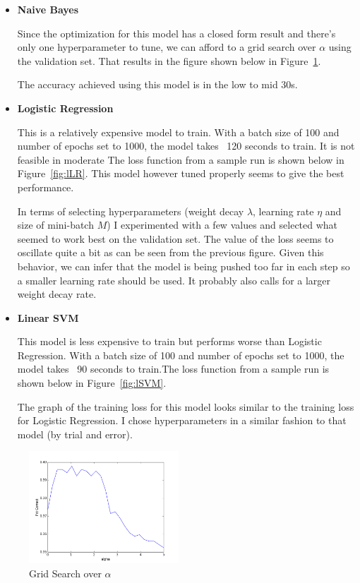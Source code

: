 \documentclass[11pt]{article}
\begin{document}
\begin{itemize}
    \item \textbf{Naive Bayes}

    Since the optimization for this model has a closed form result and there's
    only one hyperparameter to tune, we can afford to a grid search over $\alpha$
    using the validation set. That results in the figure shown below in
    Figure~\ref{fig:nbA}.

    The accuracy achieved using this model is in the low to mid 30s.

    \item \textbf{Logistic Regression}

    This is a relatively expensive model to train. With a batch size of 100 and
    number of epochs set to 1000, the model takes ~120 seconds to train. It is not
    feasible in moderate The loss function from a sample run is shown below in
    Figure~\ref{fig:lLR}. This model however tuned properly seems to give the best
    performance.

    In terms of selecting hyperparameters (weight decay $\lambda$, learning rate
    $\eta$ and size of mini-batch $M$) I experimented with a few values and
    selected what seemed to work best on the validation set. The value of the loss
    seems to oscillate quite a bit as can be seen from the previous figure. Given
    this behavior, we can infer that the model is being pushed too far in each step
    so a smaller learning rate should be used. It probably also calls for a larger
    weight decay rate.

    \item \textbf{Linear SVM}

    This model is less expensive to train but performs worse than Logistic
    Regression. With a batch size of 100 and number of epochs set to 1000, the
    model takes ~90 seconds to train.The loss function from a sample run is shown
    below in Figure~\ref{fig:lSVM}.

    The graph of the training loss for this model looks similar to the training
    loss for Logistic Regression. I chose hyperparameters in a similar fashion
    to that model (by trial and error).
\end{itemize}

\begin{figure}
  \centering
  \includegraphics[width=0.5\textwidth]{nbAlphaGS}
  \caption{\label{fig:nbA} Grid Search over $\alpha$}
\end{figure}
\end{document}
